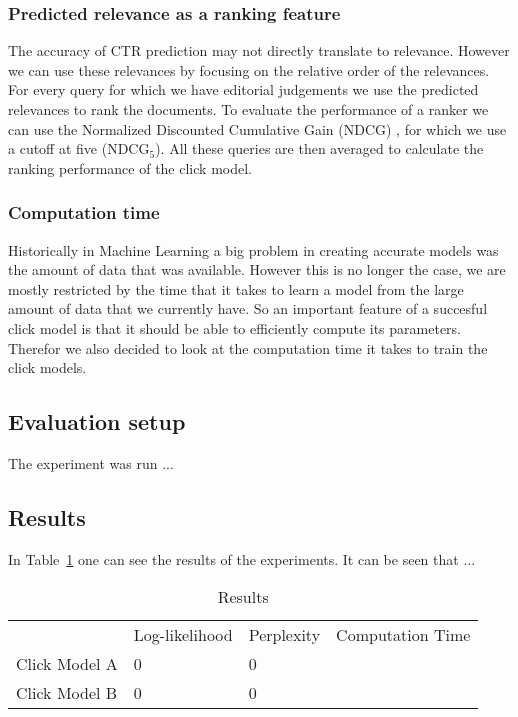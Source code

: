 
\subsubsection{Predicted relevance as a ranking feature}
The accuracy of CTR prediction may not directly translate to relevance. However we can use these relevances by focusing on the relative order of the relevances. For every query for which we have editorial judgements we use the predicted relevances to rank the documents. To evaluate the performance of a ranker we can use the Normalized Discounted Cumulative Gain (NDCG) \cite{NDCG}, for which we use a cutoff at five (NDCG$_5$). All these queries are then averaged to calculate the ranking performance of the click model.

\subsubsection{Computation time}
Historically in Machine Learning a big problem in creating accurate models was the amount of data that was available. However this is no longer the case, we are mostly restricted by the time that it takes to learn a model from the large amount of data that we currently have. So an important feature of a succesful click model is that it should be able to efficiently compute its parameters. Therefor we also decided to look at the computation time it takes to train the click models.

\subsection{Evaluation setup}
The experiment was run ...

\subsection{Results}
In Table~\ref{table:results} one can see the results of the experiments.
It can be seen that ...

\begin{table}[ht]
\centering
\begin{tabular}{l|lll|}
\cline{2-4}
                                          & Log-likelihood  & Perplexity        & Computation Time \\
\cline{1-4}
\multicolumn{1}{|l|}{Click Model A}       & 0               & 0                 &   \\
\multicolumn{1}{|l|}{Click Model B}       & 0               & 0                 &   \\
\cline{1-4}
\end{tabular}
\caption{Results}
\label{table:results}
\end{table}
